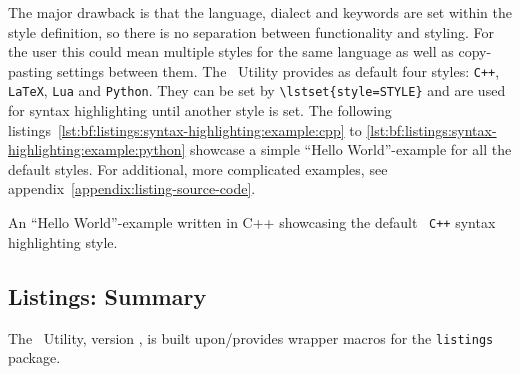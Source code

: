 		The major drawback is that the language, dialect and keywords are set within the style definition, so there is no separation between functionality and styling. For the user this could mean multiple styles for the same language as well as copy-pasting settings between them.
		\newline The \productName~Utility provides as default four styles: \lstinline$C++$, \lstinline$LaTeX$, \lstinline$Lua$ and \lstinline$Python$. They can be set by \lstinline$\lstset{style=STYLE}$ and are used for syntax highlighting until another style is set. The following \mbox{listings \ref{lst:bf:listings:syntax-highlighting:example:cpp}} to \ref{lst:bf:listings:syntax-highlighting:example:python} showcase a simple \enquote{Hello World}-example for all the default styles. For additional, more complicated examples, see \mbox{appendix \ref{appendix:listing-source-code}}. 
		
		\newpage
		\lstset{style=C++}
		{%
			An \enquote{Hello World}-example written in C++ showcasing the default \productName~\lstinline$C++$ syntax highlighting style.%
		}
		\lstset{style=LaTeX}
		\lstset{style=Lua}
		\lstset{style=Python}

	\newpage
	\subsection{Listings: Summary}
		The \productName~Utility, version \productVersion, is built upon/provides wrapper macros for the \lstinline$listings$ package.
		\lstset{style=LaTeX}
